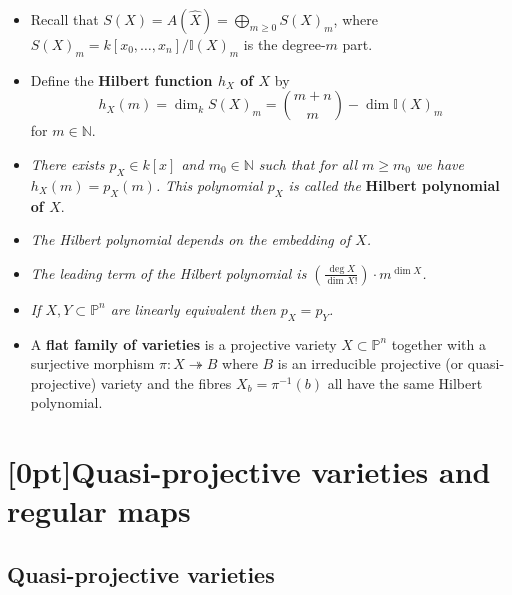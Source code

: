 \documentclass[10pt]{article}
\newcommand{\nn}{\mathbb{N}}
\newcommand{\epi}{\twoheadrightarrow}
\newcommand{\ide}{\mathbb{I}}
\newcommand{\kzn}{{k[x_0,\ldots,x_n]}}
\newcommand{\pee}{\mathbb{P}}
\newcommand{\AG}{\textcolor{green}{AG}}
\begin{document}
            \begin{itemize}
                \item Recall that $S(X)=A(\widehat{X})=\bigoplus_{m\geqslant0} S(X)_m$, where $S(X)_m=\kzn/\ide(X)_m$ is the degree-$m$ part.
                \item Define the \textbf{Hilbert function $h_X$ of $X$} by
                    \begin{equation*}
                        h_X(m)=\dim_k S(X)_m=\binom{m+n}{m}-\dim\ide(X)_m
                    \end{equation*}
                    for $m\in\nn$.
                \item \emph{There exists $p_X\in k[x]$ and $m_0\in\nn$ such that for all $m\geqslant m_0$ we have $h_X(m)=p_X(m)$.}
                    \emph{This polynomial $p_X$ is called the} \textbf{Hilbert polynomial of $X$}.
                \item \emph{The Hilbert polynomial depends on the embedding of $X$.}
                \item \emph{The leading term of the Hilbert polynomial is $\left(\frac{\deg X}{\dim X!}\right)\cdot m^{\dim X}$.}
                \item \emph{If $X,Y\subset\pee^n$ are linearly equivalent then $p_X=p_Y$.}
                \item A \textbf{flat family of varieties} is a projective variety $X\subset\pee^n$ together with a surjective morphism $\pi\colon X\epi B$ where $B$ is an irreducible projective (or quasi-projective) variety and the fibres $X_b=\pi^{-1}(b)$ all have the same Hilbert polynomial.
            \end{itemize}

    \section{\protect\marginnote{\AG}[0pt]Quasi-projective varieties and regular maps}

        \subsection{Quasi-projective varieties}
\end{document}
